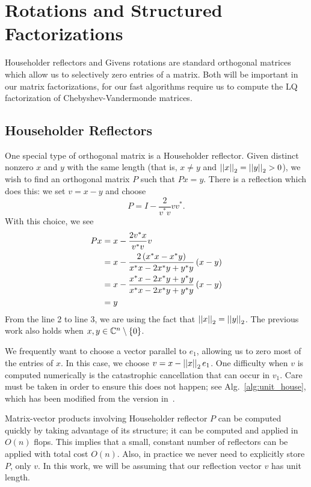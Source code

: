 \section{Rotations and Structured Factorizations}
\label{sec:rotations}

Householder reflectors and Givens rotations are
standard orthogonal matrices which allow us to selectively
zero entries of a matrix.
Both will be important
in our matrix factorizations, for our fast algorithms require
us to compute the LQ factorization of Chebyshev-Vandermonde matrices.

\subsection{Householder Reflectors}
One special type of orthogonal matrix is a Householder reflector.
Given distinct nonzero $x$ and $y$ with the same length
(that is, $x\ne y$ and $\left| \left| x \right| \right|_{2} = \left| \left| y \right| \right|_{2} > 0$), we wish to find an
orthogonal matrix $P$ such that $Px = y$.
There is a reflection which does this: we set $v = x - y$ and choose
%
\begin{equation}
    P = I - \frac{2}{v^{*}v}vv^{*}.
\end{equation}
%
With this choice, we see
%
\begin{align}
    Px  &= x - \frac{2v^{*}x}{v^{*}v}v \nonumber\\
        &= x - \frac{2\left( x^{*}x - x^{*}y \right)}{x^{*}x - 2x^{*}y + y^{*}y}
            \left( x - y \right) \nonumber\\
        &= x - \frac{x^{*}x - 2x^{*}y + y^{*}y}{x^{*}x - 2x^{*}y + y^{*}y}
            \left( x - y \right) \nonumber\\
        &= y
\end{align}
%
From the line 2 to line 3, we are using the fact that
$\left| \left| x \right| \right|_{2} = \left| \left| y \right| \right|_{2}$.
The previous work also holds when
$x,y\in\mathbb{C}^{n}\setminus\left\{ 0 \right\}$.

We frequently want to choose a vector parallel to $e_{1}$,
allowing us to zero most of the entries of $x$.
In this case, we choose $v = x - \left| \left| x \right| \right|_{2}e_{1}$.
One difficulty when $v$ is computed numerically is
the catastrophic cancellation that can occur in $v_{1}$.
Care must be taken in order to ensure this does not happen;
see Alg.~\ref{alg:unit_house}, which has been modified
from the version in~\cite[Alg.~5.1.1]{gvl4}.



Matrix-vector products involving Householder reflector $P$ can be
computed quickly by taking advantage of its structure; it can
be computed and applied in $O(n)$ flops.
This implies that a small, constant number of reflectors
can be applied with total cost $O(n)$.
Also, in practice we never need to explicitly store $P$, only $v$.
In this work, we will be assuming that our reflection vector
$v$ has unit length.



